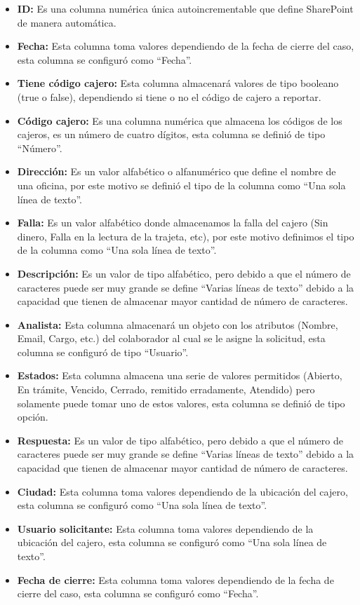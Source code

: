 \begin{itemize}
	\item \textbf{ID: }Es una columna numérica única autoincrementable que define SharePoint de manera automática.
	\item \textbf{Fecha: } Esta columna toma valores dependiendo de la fecha de cierre del caso, esta columna se configuró como ``Fecha''.
	\item \textbf{Tiene código cajero: }Esta columna almacenará valores de tipo booleano (true o false), dependiendo si tiene o no el código de cajero a reportar.
	\item \textbf{Código cajero: }Es una columna numérica que almacena los códigos de los cajeros, es un número de cuatro dígitos, esta columna se definió de tipo ``Número''.
	\item \textbf{Dirección: } Es un valor alfabético o alfanumérico que define el nombre de una oficina, por este motivo se definió el tipo de la 
	columna como ``Una sola línea de texto''.
	\item \textbf{Falla: }Es un valor alfabético donde almacenamos la falla del cajero (Sin dinero, Falla en la lectura de la trajeta, etc), por este motivo definimos el tipo de la columna como ``Una sola línea de texto''.
	\item \textbf{Descripción: } Es un valor de tipo alfabético, pero debido a que el número de caracteres puede ser muy grande se define ``Varias líneas de texto'' debido a la capacidad que tienen de almacenar mayor cantidad de número de caracteres.
	\item \textbf{Analista: } Esta columna almacenará un objeto con los atributos (Nombre, Email, Cargo, etc.) del colaborador al cual se le asigne la solicitud, esta columna se configuró de tipo ``Usuario''.
	\item \textbf{Estados: }Esta columna almacena una serie de valores permitidos (Abierto, En trámite, Vencido, Cerrado, remitido erradamente, Atendido) pero solamente puede tomar uno de estos valores, esta columna se definió de tipo opción.
	\item \textbf{Respuesta: } Es un valor de tipo alfabético, pero debido a que el número de caracteres puede ser muy grande se define ``Varias líneas de texto'' debido a la capacidad que tienen de almacenar mayor cantidad de número de caracteres.
	\item \textbf{Ciudad: } Esta columna toma valores dependiendo de la ubicación del cajero, esta columna se configuró como ``Una sola línea de texto''.
	\item \textbf{Usuario solicitante: } Esta columna toma valores dependiendo de la ubicación del cajero, esta columna se configuró como ``Una sola línea de texto''.
	\item \textbf{Fecha de cierre: } Esta columna toma valores dependiendo de la fecha de cierre del caso, esta columna se configuró como ``Fecha''.
\end{itemize}

